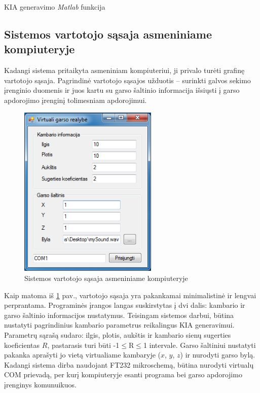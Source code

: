\documentclass[]{vgtuef}
\begin{document}
{\begin{cfigure}
  \centering
  \caption{KIA generavimo \textit{Matlab} funkcija}
  \label{code:RIA_gen}
  
\end{cfigure}

\newpage

\subsection{Sistemos vartotojo sąsaja asmeniniame kompiuteryje}

Kadangi sistema pritaikyta asmeniniam kompiuteriui, ji privalo turėti grafinę vartotojo sąsaja. Pagrindinė vartotojo sąsajos užduotis -- surinkti galvos sekimo įrenginio duomenis ir juos kartu su garso šaltinio informacija išsiųsti į garso apdorojimo įrenginį tolimesniam apdorojimui.

\begin{figure}[htbp]
  \centering
  \includegraphics[width=250px]{img/GUI.png}
  \caption{Sistemos vartotojo sąsaja asmeniniame kompiuteryje}
  \label{fig:GUI}
\end{figure}

Kaip matoma iš \ref{fig:GUI} pav., vartotojo sąsaja yra pakankamai minimalistinė ir lengvai perprantama. Programinės įrangos langas suskirstytas į dvi dalis: kambario ir garso šaltinio informacijos nustatymus.
Teisingam sistemos darbui, būtina nustatyti pagrindinius kambario parametrus reikalingus KIA generavimui. Parametrų sąrašą sudaro: ilgis, plotis, aukštis ir kambario sienų sugerties koeficientas $R$, pastarasis turi būti -1$\leq$R$\leq$1 intervale.
Garso šaltiniui nustatyti pakanka aprašyti jo vietą virtualiame kambaryje ($x$, $y$, $z$) ir nurodyti garso bylą.
Kadangi sistema dirba naudojant FT232 mikroschemą, būtina nurodyti virtualų COM prievadą, per kurį kompiuteryje esanti programa bei garso apdorojimo įrenginys komunuikuos. 

}
\end{document}
